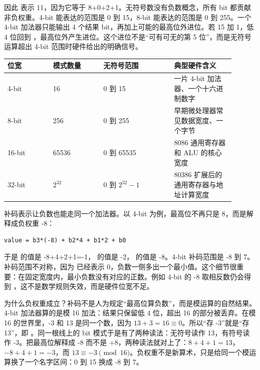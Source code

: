 因此  表示 11，因为它等于 8+0+2+1。无符号数没有负数概念，所有 bit 都贡献非负权重。4-bit 能表达的范围是 0 到 15，8-bit 能表达的范围是 0 到 255。一个 4-bit 加法器只能输出 4 个结果 bit，再加上可能的最高位外进位。若 15 加 1，低 4 位回到 ，最高位外产生进位。这个进位不是“可有可无的第 5 位”，而是无符号运算超出 4-bit 范围时硬件给出的明确信号。

\begin{longtable}{L{0.18\linewidth}L{0.2\linewidth}L{0.28\linewidth}L{0.24\linewidth}}
\toprule
位宽 & 模式数量 & 无符号范围 & 典型硬件含义 \\
-bit & 16 & 0 到 15 & 一片 4-bit 加法器、一个十六进制数字 \\
8-bit & 256 & 0 到 255 & 早期微处理器常见数据宽度、一个字节 \\
16-bit & 65536 & 0 到 65535 & 8086 通用寄存器和 ALU 的核心宽度 \\
32-bit & $2^{32}$ & 0 到 $2^{32}-1$ & 80386 扩展后的通用寄存器与地址计算宽度 \\
\bottomrule
\end{longtable}

补码表示让负数也能走同一个加法器。以 4-bit 为例，最高位不再只是 8，而是解释成负权重 -8：

\begin{lstlisting}
value = b3*(-8) + b2*4 + b1*2 + b0
\end{lstlisting}

于是  的值是 -8+4+2+1=-1， 的值是 -2， 的值是 -8。4-bit 补码范围是 -8 到 7。补码范围不对称，因为  已经表示 0，负数一侧多出一个最小值。这个细节很重要：在固定宽度内，最小负数没有对应的正数。例如 4-bit 的 -8 取相反数仍会得到 ，这不是数学规则失效，而是硬件位宽不足。

为什么负权重成立？补码不是人为规定“最高位算负数”，而是模运算的自然结果。4-bit 加法器算的是模 16 加法：结果只保留低 4 位，超出 16 的部分被丢弃。在模 16 的世界里，-3 和 13 是同一个数，因为 $13+3=16\equiv 0$。所以“存 -3”就是“存 13”，即 。同一根线上的 bit 模式于是有了两种读法：无符号读作 13，有符号读作 -3。把最高位解释成 -8 而不是 +8，两种读法就对上了：$8+4+1=13$，$-8+4+1=-3$，而 $13\equiv-3 \pmod{16}$。负权重不是新算术，只是给同一个模运算换了一个名字区间：0 到 15 换成 -8 到 7。

